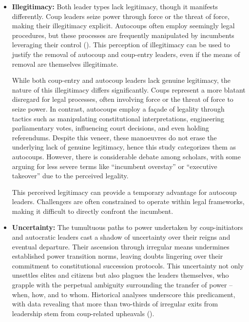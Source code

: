\documentclass[
  12pt,
]{report}
\begin{document}
\begin{itemize}
\item
  \textbf{Illegitimacy:} Both leader types lack legitimacy, though it
  manifests differently. Coup leaders seize power through force or the
  threat of force, making their illegitimacy explicit. Autocoups often
  employ seemingly legal procedures, but these processes are frequently
  manipulated by incumbents leveraging their control
  (). This perception of illegitimacy
  can be used to justify the removal of autocoup and coup-entry leaders,
  even if the means of removal are themselves illegitimate.

  While both coup-entry and autocoup leaders lack genuine legitimacy,
  the nature of this illegitimacy differs significantly. Coups represent
  a more blatant disregard for legal processes, often involving force or
  the threat of force to seize power. In contrast, autocoups employ a
  façade of legality through tactics such as manipulating constitutional
  interpretations, engineering parliamentary votes, influencing court
  decisions, and even holding referendums. Despite this veneer, these
  manoeuvres do not erase the underlying lack of genuine legitimacy,
  hence this study categorizes them as autocoups. However, there is
  considerable debate among scholars, with some arguing for less severe
  terms like ``incumbent overstay'' or ``executive takeover'' due to the
  perceived legality.

  This perceived legitimacy can provide a temporary advantage for
  autocoup leaders. Challengers are often constrained to operate within
  legal frameworks, making it difficult to directly confront the
  incumbent.
\item
  \textbf{Uncertainty:} The tumultuous paths to power undertaken by
  coup-initiators and autocratic leaders cast a shadow of uncertainty
  over their reigns and eventual departure. Their ascension through
  irregular means undermines established power transition norms, leaving
  doubts lingering over their commitment to constitutional succession
  protocols. This uncertainty not only unsettles elites and citizens but
  also plagues the leaders themselves, who grapple with the perpetual
  ambiguity surrounding the transfer of power -- when, how, and to whom.
  Historical analyses underscore this predicament, with data revealing
  that more than two-thirds of irregular exits from leadership stem from
  coup-related upheavals ().


\end{itemize}
\end{document}
